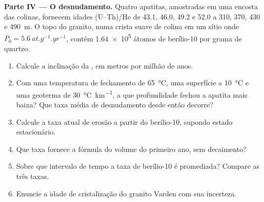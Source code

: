 \begin{problem}
\medskip\noindent\textbf{Parte IV --- O desnudamento.} Quatro apatitas, amostradas
em uma encosta das colinas, fornecem idades (U--Th)/He de 43.1, 46.0, 49.2 e
\qty{52.0}{\Ma} a 310, 370, 430 e \qty{490}{m}. O topo do granito,
numa crista suave de colina em um sítio onde $P_0 = \qty{5.6}{at.g^{-1}.yr^{-1}}$,
contém \num{1.64e5} átomos de berílio-10 por grama de quartzo.
\begin{enumerate}[resume]
\item Calcule a inclinação da , em metros por
milhão de anos.
\item Com uma temperatura de fechamento de \qty{65}{\celsius}, uma superfície a
\qty{10}{\celsius} e uma geoterma de \qty{30}{\celsius.km^{-1}}, a que profundidade
fechou a apatita mais baixa? Que taxa média de desnudamento desde então decorre?
\item Calcule a taxa atual de erosão a partir do berílio-10, supondo
estado estacionário.
\item Que taxa fornece a fórmula do volume do primeiro ano, sem decaimento?
\item Sobre que intervalo de tempo a taxa de berílio-10 é promediada? Compare as três
taxas.
\item Enuncie a idade de cristalização do granito Varden com sua
incerteza.
\end{enumerate}
\end{problem}
